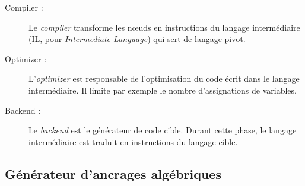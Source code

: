 \begin{description}
  \item[Compiler :] Le \emph{compiler} transforme les nœuds {\tom} en
    instructions du langage intermédiaire (IL, pour \emph{Intermediate
    Language}) qui sert de langage pivot.

  \item[Optimizer :] L'\emph{optimizer} est responsable de l'optimisation du
    code écrit dans le langage intermédiaire. Il limite par exemple le nombre
    d'assignations de variables.

  \item[Backend :] Le \emph{backend} est le générateur de code cible. Durant
    cette phase, le langage intermédiaire est traduit en instructions du
    langage cible.

\end{description}



\subsection{Générateur d'ancrages algébriques}
\label{ch:outils:subsec:tomemf}

